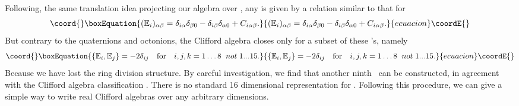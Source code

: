 \documentclass[a4paper,12pt]{book}
\begin{document}
Following, the same translation idea projecting our algebra \coordHE{} over \coordHE{}, any \coordHE{} is given by a relation similar to that for \coordHE{}%
\begin{equation}\coord{}\boxEquation{
(\Bbb{E}_{i})_{\alpha \beta }=\delta _{i\alpha }\delta _{\beta 0}-\delta
_{i\beta }\delta _{\alpha 0}+C_{i\alpha \beta }.
}{
(\Bbb{E}_{i})_{\alpha \beta }=\delta _{i\alpha }\delta _{\beta 0}-\delta
_{i\beta }\delta _{\alpha 0}+C_{i\alpha \beta }.
}{ecuacion}\coordE{}\end{equation}
But contrary to the quaternions and octonions, the Clifford algebra closes
only for a subset of these \coordHE{}'s, namely 
\begin{equation}\coord{}\boxEquation{
\{\Bbb{E}_{i},\Bbb{E}_{j}\}=-2\delta _{ij}\quad \mbox{for}\quad
i,j,k=1\ldots 8\;\;not\;1...15.  \label{nrd}
}{
\{\Bbb{E}_{i},\Bbb{E}_{j}\}=-2\delta _{ij}\quad \mbox{for}\quad
i,j,k=1\ldots 8\;\;not\;1...15.  }{ecuacion}\coordE{}\end{equation}
Because we have lost the ring division structure. By careful investigation,
we find that another ninth \coordHE{} \ can be constructed, in agreement
with the Clifford algebra classification \cite{abs}. There is no standard\coordHE{} 16 dimensional
representation for \coordHE{}. Following this procedure, we
can give a simple way to write real Clifford algebras over any arbitrary
dimensions.
\end{document}
